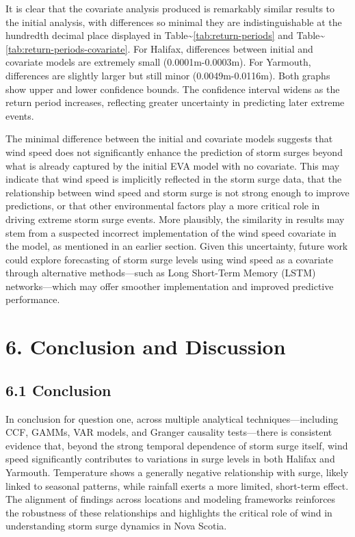 \documentclass[
  letterpaper,
  DIV=11,
  numbers=noendperiod]{scrartcl}
\begin{document}
It is clear that the covariate analysis produced is remarkably similar
results to the initial analysis, with differences so minimal they are
indistinguishable at the hundredth decimal place displayed in
Table\textasciitilde{}\ref{tab:return-periods} and
Table\textasciitilde{}\ref{tab:return-periods-covariate}. For Halifax,
differences between initial and covariate models are extremely small
(0.0001m-0.0003m). For Yarmouth, differences are slightly larger but
still minor (0.0049m-0.0116m). Both graphs show upper and lower
confidence bounds. The confidence interval widens as the return period
increases, reflecting greater uncertainty in predicting later extreme
events.

The minimal difference between the initial and covariate models suggests
that wind speed does not significantly enhance the prediction of storm
surges beyond what is already captured by the initial EVA model with no
covariate. This may indicate that wind speed is implicitly reflected in
the storm surge data, that the relationship between wind speed and storm
surge is not strong enough to improve predictions, or that other
environmental factors play a more critical role in driving extreme storm
surge events. More plausibly, the similarity in results may stem from a
suspected incorrect implementation of the wind speed covariate in the
model, as mentioned in an earlier section. Given this uncertainty,
future work could explore forecasting of storm surge levels using wind
speed as a covariate through alternative methods---such as Long
Short-Term Memory (LSTM) networks---which may offer smoother
implementation and improved predictive performance.

\section{6. Conclusion and Discussion}\label{conclusion-and-discussion}

\subsection{6.1 Conclusion}\label{conclusion}

In conclusion for question one, across multiple analytical
techniques---including CCF, GAMMs, VAR models, and Granger causality
tests---there is consistent evidence that, beyond the strong temporal
dependence of storm surge itself, wind speed significantly contributes
to variations in surge levels in both Halifax and Yarmouth. Temperature
shows a generally negative relationship with surge, likely linked to
seasonal patterns, while rainfall exerts a more limited, short-term
effect. The alignment of findings across locations and modeling
frameworks reinforces the robustness of these relationships and
highlights the critical role of wind in understanding storm surge
dynamics in Nova Scotia.
\end{document}
